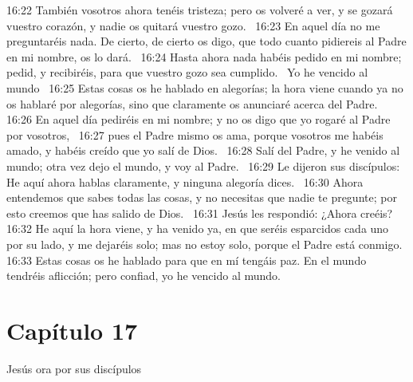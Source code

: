 16:22 También vosotros ahora tenéis tristeza; pero os volveré a ver, y se gozará vuestro corazón, y nadie os quitará vuestro gozo.  
16:23 En aquel día no me preguntaréis nada. De cierto, de cierto os digo, que todo cuanto pidiereis al Padre en mi nombre, os lo dará.  
16:24 Hasta ahora nada habéis pedido en mi nombre; pedid, y recibiréis, para que vuestro gozo sea cumplido.  
Yo he vencido al mundo  
16:25 Estas cosas os he hablado en alegorías; la hora viene cuando ya no os hablaré por alegorías, sino que claramente os anunciaré acerca del Padre.  
16:26 En aquel día pediréis en mi nombre; y no os digo que yo rogaré al Padre por vosotros,  
16:27 pues el Padre mismo os ama, porque vosotros me habéis amado, y habéis creído que yo salí de Dios.  
16:28 Salí del Padre, y he venido al mundo; otra vez dejo el mundo, y voy al Padre.  
16:29 Le dijeron sus discípulos: He aquí ahora hablas claramente, y ninguna alegoría dices.  
16:30 Ahora entendemos que sabes todas las cosas, y no necesitas que nadie te pregunte; por esto creemos que has salido de Dios.  
16:31 Jesús les respondió: ¿Ahora creéis?  
16:32 He aquí la hora viene, y ha venido ya, en que seréis esparcidos cada uno por su lado, y me dejaréis solo; mas no estoy solo, porque el Padre está conmigo.  
16:33 Estas cosas os he hablado para que en mí tengáis paz. En el mundo tendréis aflicción; pero confiad, yo he vencido al mundo.  
\section*{Capítulo 17 }
Jesús ora por sus discípulos 

